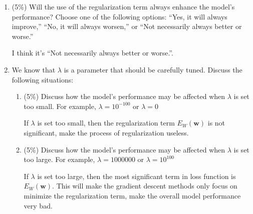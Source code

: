 \documentclass[twocolumn]{extarticle}
\begin{document}
\begin{enumerate}
\begin{enumerate}[label*=\arabic*.]
	\item (5\%) Will the use of the regularization term always enhance the model's performance? Choose one of the following options: ``Yes, it will always improve,'' ``No, it will always worsen,'' or ``Not necessarily always better or worse.''
	
	I think it's ``Not necessarily always better or worse.''.
	
	
	\item We know that $\lambda$ is a parameter that should be carefully tuned. Discuss the following situations:
	\begin{enumerate}[label*=\arabic*.]
		\item (5\%) Discuss how the model’s performance may be affected when $\lambda$ is set too small. For example, $\lambda=10^{-100}$ or $\lambda=0$
		
		If $\lambda$ is set too small, then the regularization term $E_{W}(\textbf{w})$ is not significant, make the process of regularization useless.
		
		\item (5\%) Discuss how the model’s performance may be affected when $\lambda$ is set too large. For example, $\lambda=1000000$ or $\lambda=10^{100}$
		
		If $\lambda$ is set too large, then the most significant term in loss function is $E_{W}(\textbf{w})$. This will make the gradient descent methods only focus on minimize the regularization term, make the overall model performance very bad.
		
	\end{enumerate}
\end{enumerate}
\end{enumerate}
\end{document}
